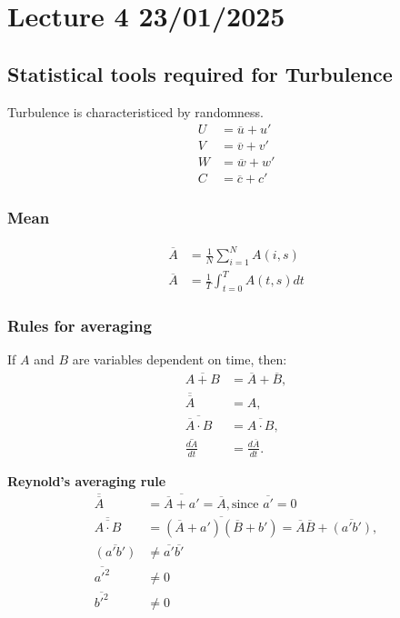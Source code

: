 \documentclass[fleqn,10pt]{SelfArx} %
\begin{document}
\clearpage

\section{Lecture 4 23/01/2025}
\subsection{Statistical tools required for Turbulence}

Turbulence is characteristiced by randomness.
\begin{align*}
	U & = \overline{u} + u' \\
	V & = \overline{v} + v' \\
	W & = \overline{w} + w' \\
	C & = \overline{c} + c'
\end{align*}

\subsubsection{Mean}
\begin{align*}
	\overline{A} & = \frac{1}{N}\sum^N_{i=1}A(i,s)   \\
	\overline{A} & = \frac{1}{T}\int^T_{t=0}A(t,s)dt
\end{align*}

\subsubsection{Rules for averaging}
If $A$ and $B$ are variables dependent on time, then:
\begin{align*}
	\overline{A + B}                & = \overline{A} + \overline{B}, \\
	\overline{\overline{A}}         & = A,                           \\
	\overline{\overline{A} \cdot B} & = \overline{A \cdot B},        \\
	\overline{\frac{dA}{dt}}        & = \frac{d\overline{A}}{dt}.
\end{align*}

\textbf{Reynold's averaging rule}
\begin{align*}
	\overline{\overline{A}}         & = \overline{\overline{A}+a'} = \overline{A}, \text{since } \overline{a'}=0                      \\
	\overline{\overline{A \cdot B}} & = \overline{(\overline{A}+a')(\overline{B}+b')} = \overline{A}\overline{B} + \overline{(a'b')}, \\
	\overline{(a'b')}               & \neq  \overline{a'}\overline{b'}                                                                \\
	\overline{a'^2}                 & \neq 0                                                                                          \\
	\overline{b'^2}                 & \neq 0
\end{align*}
\end{document}
